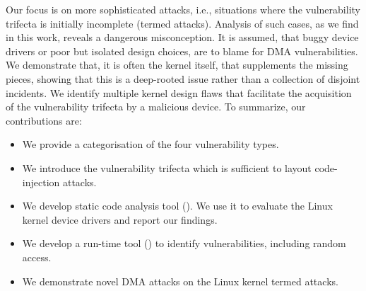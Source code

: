 Our focus is on more sophisticated attacks, i.e., situations where the vulnerability trifecta is initially incomplete (termed \compound attacks).
Analysis of such cases, as we find in this work, reveals a dangerous misconception. It is assumed, that buggy device drivers or poor but isolated design choices, are to blame for DMA vulnerabilities. 
We demonstrate that, it is often the kernel itself, that supplements the missing pieces, showing that this is a deep-rooted issue rather than a collection of disjoint incidents.
We identify multiple kernel design flaws that facilitate the acquisition of the vulnerability trifecta by a malicious device.
To summarize, our contributions are:
\begin{itemize}
    \item We provide a categorisation of the four \subpage{} vulnerability types.
    \item We introduce the vulnerability trifecta which is sufficient to layout code-injection attacks.
    \item We develop static code analysis tool (\tool). We use it to evaluate the Linux kernel device drivers and report our findings.
    \item We develop a run-time tool (\dkasan) to identify \subpage{} vulnerabilities, including random access.
    \item We demonstrate novel DMA attacks on the Linux kernel termed \compound{} attacks.
\end{itemize}



